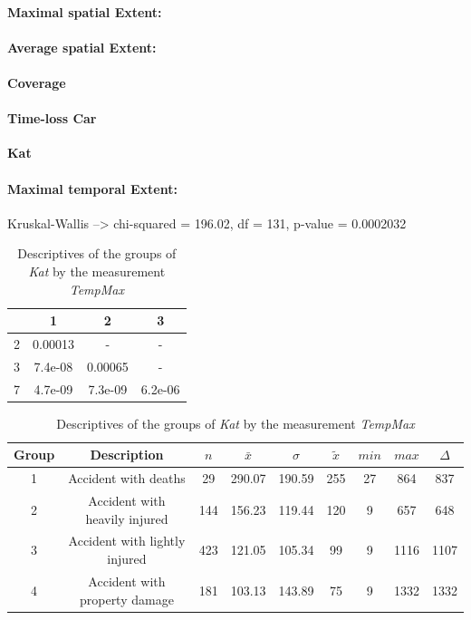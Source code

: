 \begin{table}[ht]
\paragraph{Maximal spatial Extent:}
\paragraph{Average spatial Extent:}
\paragraph{Coverage}
\paragraph{Time-loss Car}

\large
\centerline{\textbf{Kat}}
\normalsize

\paragraph{Maximal temporal Extent:}
Kruskal-Wallis --> chi-squared = 196.02, df = 131, p-value = 0.0002032

\begin{table}[ht]
	\centering
	\begin{tabular}{c|c|c|c}
		\toprule  
  		& 1 & 2 & 3 \\ 
  		\midrule    
		2 & 0.00013 & -       & -   \\   
		\midrule
		3 & 7.4e-08 & 0.00065 & -     \\ 
		\midrule
		7 & 4.7e-09 & 7.3e-09 & 6.2e-06 \\
 		\bottomrule
	\end{tabular}
	\caption{Pairwise comparisons of the groups of \textit{Kat} by the measurement \textit{TempMax} using Wilcoxon rank sum test with continuity correction}
\end{table}

\begin{table}[ht]
	\centering
	\begin{tabular}{c|c|c|c|c|c|c|c|c}
		\toprule  
		Group & Description & $n$ & $\bar{x}$ & $\sigma$ & $\tilde{x}$ & $min$ & $max$ & $\Delta$ \\
		\midrule
		1 & Accident with deaths & 29 & 290.07 & 190.59 & 255 & 27 & 864 & 837 \\ 
 		2 & Accident with heavily injured & 144 & 156.23 & 119.44 & 120 & 9 & 657 & 648 \\
 		3 & Accident with lightly injured & 423 & 121.05 & 105.34 & 99 & 9 & 1116 & 1107 \\
 		4 & Accident with property damage & 181 & 103.13 & 143.89 & 75 & 9 & 1332 & 1332 \\ 
 		\bottomrule
	\end{tabular}
	\caption{Descriptives of the groups of \textit{Kat} by the measurement \textit{TempMax}}
\end{table}


\end{table}
